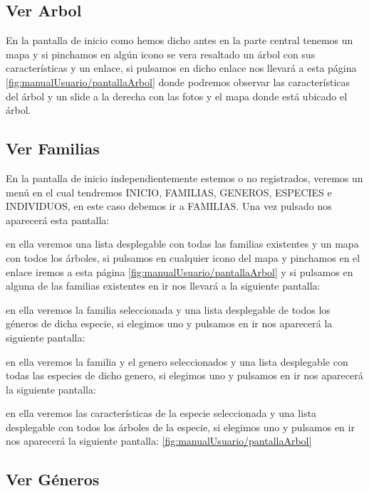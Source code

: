 \subsection{Ver Arbol}

En la pantalla de inicio como hemos dicho antes en la parte central tenemos un mapa y si pinchamos en algún icono se vera resaltado un árbol con sus características y un enlace, si pulsamos en dicho enlace nos llevará a esta página \ref{fig:manualUsuario/pantallaArbol} donde podremos observar las características del árbol y un slide a la derecha con las fotos y el mapa donde está ubicado el árbol.

\subsection{Ver Familias}

En la pantalla de inicio independientemente estemos o no registrados, veremos un menú en el cual tendremos INICIO, FAMILIAS, GENEROS, ESPECIES e INDIVIDUOS, en este caso debemos ir a FAMILIAS. Una vez pulsado nos aparecerá esta pantalla: 

en ella veremos una lista desplegable con todas las familias existentes y un mapa con todos los árboles, si pulsamos en cualquier icono del mapa y pinchamos en el enlace iremos a esta página \ref{fig:manualUsuario/pantallaArbol} y si pulsamos en alguna de las familias existentes en ir nos llevará a la siguiente pantalla:

en ella veremos la familia seleccionada y una lista desplegable de todos los géneros de dicha especie, si elegimos uno y pulsamos en ir nos aparecerá la siguiente pantalla:

en ella veremos la familia y el genero seleccionados y una lista desplegable con todas las especies de dicho genero, si elegimos uno y pulsamos en ir nos aparecerá la siguiente pantalla:

en ella veremos las características de la especie seleccionada y una lista desplegable con todos los árboles de la especie, si elegimos uno y pulsamos en ir nos aparecerá la siguiente pantalla: \ref{fig:manualUsuario/pantallaArbol}

\subsection{Ver Géneros}

